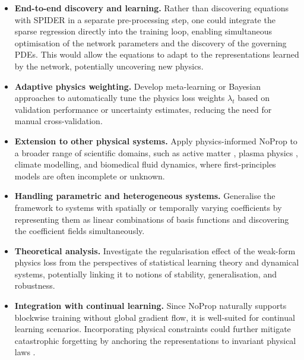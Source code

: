 \documentclass[preprint,12pt]{elsarticle}
\newcommand{\rev}[1]{\hl{#1}}
\begin{document}
\begin{itemize}
    \item \textbf{End-to-end discovery and learning.} Rather than discovering equations with SPIDER in a separate pre-processing step, one could integrate the sparse regression directly into the training loop, enabling simultaneous optimisation of the network parameters and the discovery of the governing PDEs. This would allow the equations to adapt to the representations learned by the network, potentially uncovering new physics.
    
    \item \textbf{Adaptive physics weighting.} Develop meta-learning or Bayesian approaches to automatically tune the physics loss weights $\lambda_t$ based on validation performance or uncertainty estimates, reducing the need for manual cross-validation.
    
    \item \textbf{Extension to other physical systems.} Apply physics-informed NoProp to a broader range of scientific domains, such as active matter \rev{\cite{marchetti2013hydrodynamics,ramaswamy2010active}}, plasma physics \rev{\cite{levko2024datadriven}}, climate modelling, and biomedical fluid dynamics, where first-principles models are often incomplete or unknown.
    
    \item \textbf{Handling parametric and heterogeneous systems.} Generalise the framework to systems with spatially or temporally varying coefficients by representing them as linear combinations of basis functions \rev{\cite{rudy2019data}} and discovering the coefficient fields simultaneously.
    
    \item \textbf{Theoretical analysis.} Investigate the regularisation effect of the weak-form physics loss from the perspectives of statistical learning theory and dynamical systems, potentially linking it to notions of stability, generalisation, and robustness.
    
    \item \textbf{Integration with continual learning.} Since NoProp naturally supports blockwise training without global gradient flow, it is well-suited for continual learning scenarios. Incorporating physical constraints could further mitigate catastrophic forgetting by anchoring the representations to invariant physical laws \rev{\cite{delange2021continual}}.
\end{itemize}
\end{document}
